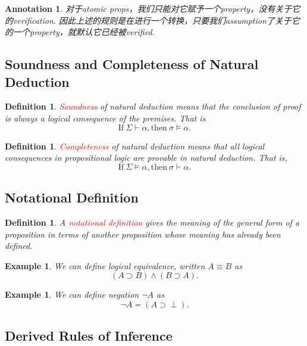 \documentclass{article}
\theoremstyle{plain}
\newtheorem{example}[theorem]{Example}
\newtheorem{definition}[theorem]{Definition}
\newtheorem{annotation}[theorem]{Annotation}
\theoremstyle{nonumberplain}
\newcommand{\redt}[1]{\textcolor{red}{#1}}
\begin{document}
\begin{annotation}
\rm 对于atomic props，我们只能对它赋予一个property，没有关于它的verification. 因此上述的规则是在进行一个转换，只要我们assumption了关于它的一个property，就默认它已经被verified. 
\end{annotation}


\subsection{Soundness and Completeness of Natural Deduction}

\begin{definition}
\rm \cite{cs245-nd}\redt{Soundness} of natural deduction means that the conclusion of proof is always a logical consequence of the premises. That is
$$
\text{If}~\Sigma \vdash \alpha, \text{then}~\sigma \vDash \alpha. 
$$ 
\end{definition}


\begin{definition}
\rm \redt{Completeness} of natural deduction means that all logical consequences in propositional logic are provable in natural deduction. That is,
$$
\text{If}~\Sigma \vDash \alpha, \text{then}~\sigma \vdash \alpha.
$$ 
\end{definition}

\newpage
\subsection{Notational Definition}

\begin{definition}
\rm A \redt{notational definition} gives the meaning of the general form of a proposition in terms of another proposition whose meaning has already been defined.
\end{definition}

\begin{example}
\rm We can define logical equivalence, written $A \equiv B$ as 
$$
(A \supset B) \wedge (B \supset A).
$$ 
\end{example}

\begin{example}
\rm We can define negation $\neg A$ as 
$$
\neg A = (A \supset \perp). 
$$
\end{example}


\newpage
\subsection{Derived Rules of Inference}
\end{document}
